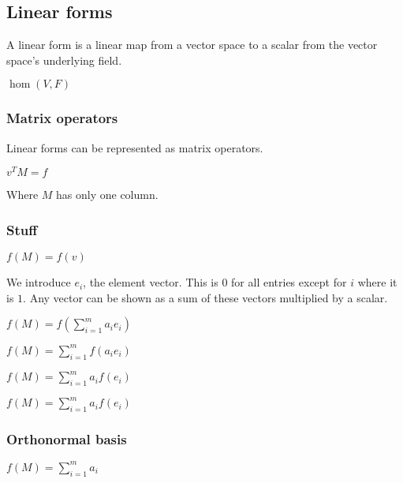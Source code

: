 
\subsection{Linear forms}

A linear form is a linear map from a vector space to a scalar from the vector space's underlying field.

\(\hom (V, F)\)

\subsubsection{Matrix operators}

Linear forms can be represented as matrix operators.

\(v^TM=f\)

Where \(M\) has only one column.

\subsubsection{Stuff}

$f(M)=f(v)$

We introduce \(e_i\), the element vector. This is \(0\) for all entries except for \(i\) where it is \(1\). Any vector can be shown as a sum of these vectors multiplied by a scalar.

$f(M)=f(\sum^m_{i=1}a_{i}e_i)$

$f(M)=\sum_{i=1}^mf(a_{i}e_i)$

$f(M)=\sum_{i=1}^ma_if(e_i)$

$f(M)=\sum_{i=1}^ma_if(e_i)$

\subsubsection{Orthonormal basis}

$f(M)=\sum_{i=1}^ma_i$

